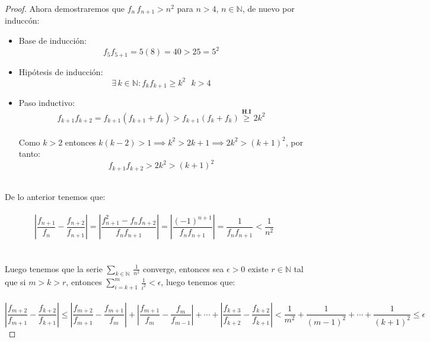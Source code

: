 \documentclass[11pt,letterpaper]{article}
\newcommand{\N}{\mathbb{N}}
\begin{document}
\begin{proof}
    Ahora demostraremos que $f_n\,f_{n+1}>n^2$ para $n>4$, $n\in\N$, de nuevo por inducc\'on:\,\\
    \begin{itemize}
        \item Base de inducci\'on:
        \begin{equation*}
            f_{5}f_{5+1}=5(8)=40>25=5^2
        \end{equation*}
        \item Hip\'otesis de inducci\'on:
        \begin{equation*}
            \exists\,k\in\N:f_{k}f_{k+1}\geq k^2\,\,\,\,k>4
        \end{equation*}
        \item Paso inductivo:
        \begin{equation*}
            f_{k+1}f_{k+2}=f_{k+1}(f_{k+1}+f_k)>f_{k+1}(f_k+f_k) \stackrel{\textbf{H.I}}{\geq}2k^2
        \end{equation*}\,\\
        Como $k>2$ entonces $k(k-2)>1\implies k^2>2k+1\implies 2k^2>(k+1)^2$, por tanto:\,\\
        \begin{equation*}
             f_{k+1}f_{k+2}>2k^2>(k+1)^2
        \end{equation*}
    \end{itemize}\,\\
    De lo anterior tenemos que:\,\\
    \,\\
    \begin{equation*}
        \left|\frac{f_{n+1}}{f_n}-\frac{f_{n+2}}{f_{n+1}}\right|=\left|\frac{f_{n+1}^2-f_nf_{n+2}}{f_nf_{n+1}}\right|=\left|\frac{(-1)^{n+1}}{f_nf_{n+1}}\right|=\frac{1}{f_nf_{n+1}}<\frac{1}{n^2}
    \end{equation*}\,\\
    \,\\
    Luego tenemos que la serie $\sum_{k\in \N}\,\frac{1}{n^2}$ converge, entonces sea $\epsilon>0$ existe $r\in \N$ tal que si $m>k>r$, entonces $\sum_{i=k+1}^m\,\frac{1}{i^2}<\epsilon$, luego tenemos que:\,\\
    \,\\
    \begin{equation*}
        \left|\frac{f_{m+2}}{f_{m+1}}-\frac{f_{k+2}}{f_{k+1}}\right|\leq\left|\frac{f_{m+2}}{f_{m+1}}-\frac{f_{m+1}}{f_{m}}\right|+\left|\frac{f_{m+1}}{f_{m}}-\frac{f_{m}}{f_{m-1}}\right|+\cdots+\left|\frac{f_{k+3}}{f_{k+2}}-\frac{f_{k+2}}{f_{k+1}}\right|<\frac{1}{m^2}+\frac{1}{(m-1)^2}+\cdots+\frac{1}{(k+1)^2}\leq \epsilon

\end{equation*}
\end{proof}
\end{document}
